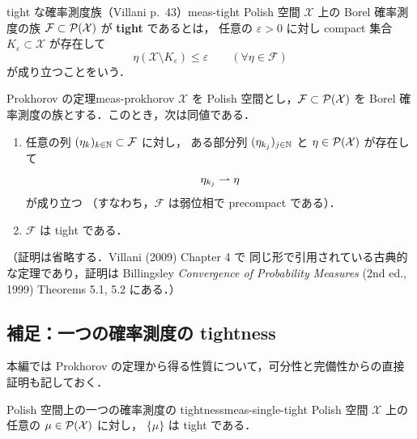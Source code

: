 \begin{definition}{tight な確率測度族（Villani p.~43）}{meas-tight}
  Polish 空間 $\mathcal{X}$ 上の Borel 確率測度の族
  $\mathcal{F}\subset\mathcal{P}(\mathcal{X})$ が \textbf{tight} であるとは，
  任意の $\varepsilon>0$ に対し compact 集合
  $K_\varepsilon\subset\mathcal{X}$ が存在して
  \[
    \eta(\mathcal{X}\setminus K_\varepsilon)\leq\varepsilon
    \qquad(\forall\eta\in\mathcal{F})
  \]
  が成り立つことをいう．
\end{definition}

\begin{theorem}{Prokhorov の定理}{meas-prokhorov}
  $\mathcal{X}$ を Polish 空間とし，$\mathcal{F}\subset\mathcal{P}(\mathcal{X})$ を
  Borel 確率測度の族とする．このとき，次は同値である．
  \begin{enumerate}
    \item 任意の列 $(\eta_k)_{k\in\mathbb{N}}\subset\mathcal{F}$ に対し，
      ある部分列 $(\eta_{k_j})_{j\in\mathbb{N}}$ と
      $\eta\in\mathcal{P}(\mathcal{X})$ が存在して
      \[
        \eta_{k_j}\rightharpoonup\eta
      \]
      が成り立つ
      （すなわち，$\mathcal{F}$ は弱位相で precompact である）．
    \item $\mathcal{F}$ は tight である．
  \end{enumerate}
  （証明は省略する．Villani (2009) Chapter 4 で
  同じ形で引用されている古典的な定理であり，証明は
  Billingsley \emph{Convergence of Probability Measures}
  (2nd ed., 1999) Theorems 5.1, 5.2 にある．）
\end{theorem}

\subsection{補足：一つの確率測度の tightness}

本編では Prokhorov の定理から得る性質について，可分性と完備性からの直接証明も記しておく．

\begin{lemma}{Polish 空間上の一つの確率測度の tightness}{meas-single-tight}
  Polish 空間 $\mathcal{X}$ 上の任意の $\mu\in\mathcal{P}(\mathcal{X})$ に対し，
  $\{\mu\}$ は tight である．
\end{lemma}

